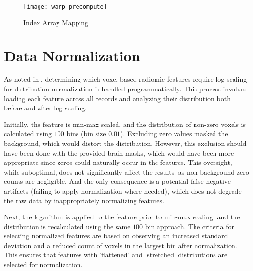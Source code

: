\begin{figure}[H]
\centering
\texttt{[image: warp\_precompute]}
\caption{Index Array Mapping}
\end{figure}

\section{Data Normalization}
\label{app:imp-norm}

As noted in , determining which voxel-based radiomic features require log scaling for distribution normalization is handled programmatically. This process involves loading each feature across all records and analyzing their distribution both before and after log scaling.\par
Initially, the feature is min-max scaled, and the distribution of non-zero voxels is calculated using $100$ bins (bin size $0.01$). Excluding zero values masked the background, which would distort the distribution. However, this exclusion should have been done with the provided brain masks, which would have been more appropriate since zeros could naturally occur in the features. This oversight, while suboptimal, does not significantly affect the results, as non-background zero counts are negligible. And the only consequence is a potential false negative artifacts (failing to apply normalization where needed), which does not degrade the raw data by inappropriately normalizing features.\par
Next, the logarithm is applied to the feature prior to min-max scaling, and the distribution is recalculated using the same $100$ bin approach. The criteria for selecting normalized features are based on observing an increased standard deviation and a reduced count of voxels in the largest bin after normalization. This ensures that features with 'flattened' and 'stretched' distributions are selected for normalization.







